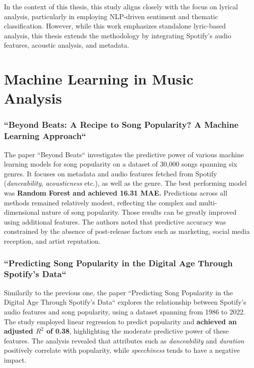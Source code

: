 In the context of this thesis, this study aligns closely with the focus on
lyrical analysis, particularly in employing NLP-driven sentiment and thematic
classification. However, while this work emphasizes standalone lyric-based
analysis, this thesis extends the methodology by integrating Spotify’s audio
features, acoustic analysis, and metadata. 


\section{Machine Learning in Music Analysis}
\label{sec:machinelearningfeaturesinmusicanalysis}

\subsubsection*{``Beyond Beats: A Recipe to Song Popularity? A Machine Learning Approach``}

The paper ``Beyond Beats`` investigates the predictive power of various machine
learning models for song popularity on a dataset of 30,000 songs spanning six
genres. It focuses on metadata and audio features fetched from
Spotify (\textit{danceability}, \textit{acousticness} etc.), as well as the
genre. The best performing model was \textbf{Random Forest and achieved 16.31 MAE.}
Predictions across all methods remained relatively modest, reflecting the
complex and multi-dimensional  nature of song popularity. Those results can be
greatly improved using additional features. The authors noted that predictive
accuracy was constrained by the absence of post-release factors such as
marketing, social media reception, and artist reputation.\cite{beyond_beats}


\subsubsection*{``Predicting Song Popularity in the Digital Age Through
Spotify’s Data``}  
Similarily to the previous one, the paper ``Predicting Song Popularity in the
Digital Age Through Spotify’s Data`` explores the relationship between
Spotify's audio features  and song popularity, using a dataset spanning from
1986 to 2022. The study employed linear regression to predict popularity and
\textbf{achieved an adjusted $R^2$ of 0.38}, highlighting the moderate
predictive power of these features. The analysis revealed that attributes such
as \textit{danceability} and \textit{duration} positively correlate with
popularity, while \textit{speechiness} tends to have a negative
impact.\cite{predicting_song_popularity_2024}
